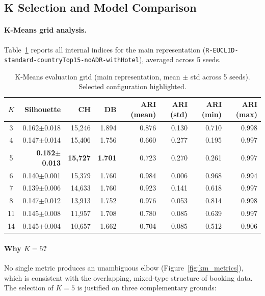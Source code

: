 \documentclass[12pt,a4paper]{article}
\begin{document}
\subsection{K Selection and Model Comparison}
\label{sec:model_comparison}

\paragraph{K-Means grid analysis.}
Table~\ref{tab:km_grid} reports all internal indices for the main
representation (\texttt{R-EUCLID-standard-countryTop15-noADR-withHotel}),
averaged across 5 seeds.

\begin{table}[H]
  \centering
  \caption{K-Means evaluation grid (main representation, mean $\pm$ std across 5 seeds).
           Selected configuration highlighted.}
  \label{tab:km_grid}
  \small
  \begin{tabular}{@{}crrrrrrr@{}}
    \toprule
    $K$ & Silhouette & CH & DB & ARI (mean) & ARI (std) & ARI (min) & ARI (max) \\
    \midrule
    3  & 0.162$\pm$0.018 & 15,246 & 1.894 & 0.876 & 0.130 & 0.710 & 0.998 \\
    4  & 0.147$\pm$0.014 & 15,406 & 1.756 & 0.660 & 0.277 & 0.195 & 0.997 \\
    \rowcolor{blue!8}
    5  & \textbf{0.152$\pm$0.013} & \textbf{15,727} & \textbf{1.701} & 0.723 & 0.270 & 0.261 & 0.997 \\
    6  & 0.140$\pm$0.001 & 15,379 & 1.760 & 0.984 & 0.006 & 0.968 & 0.994 \\
    7  & 0.139$\pm$0.006 & 14,633 & 1.760 & 0.923 & 0.141 & 0.618 & 0.997 \\
    8  & 0.147$\pm$0.012 & 13,913 & 1.752 & 0.976 & 0.053 & 0.814 & 0.998 \\
    11 & 0.145$\pm$0.008 & 11,957 & 1.708 & 0.780 & 0.085 & 0.639 & 0.997 \\
    14 & 0.145$\pm$0.004 & 10,657 & 1.662 & 0.704 & 0.085 & 0.512 & 0.906 \\
    \bottomrule
  \end{tabular}
\end{table}

\paragraph{Why $K = 5$?}
No single metric produces an unambiguous elbow
(Figure~\ref{fig:km_metrics}), which is consistent with the overlapping,
mixed-type structure of booking data.
The selection of $K=5$ is justified on three complementary grounds:
\end{document}

